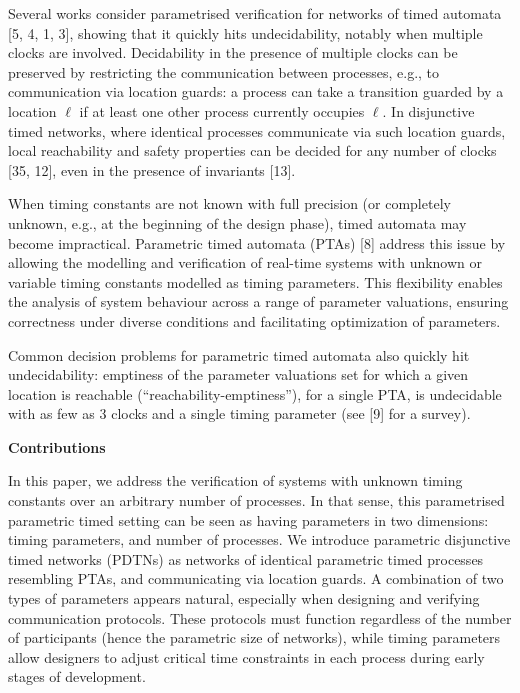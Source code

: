 \documentclass[10pt,a4paper]{article}
\begin{document}
 
 
Several works consider parametrised verification for networks of timed automata [5, 4, 1, 3], showing that it quickly hits undecidability, notably when multiple clocks are involved. Decidability in the presence of multiple clocks can be preserved by restricting the communication between processes, e.g., to communication via location guards: a process can take a transition guarded by a location $\mathrm{\ell}$ if at least one other process currently occupies $\mathrm{\ell}$. In disjunctive timed networks, where identical processes communicate via such location guards, local reachability and safety properties can be decided for any number of clocks [35, 12], even in the presence of invariants [13].\par
 
 
 
When timing constants are not known with full precision (or completely unknown, e.g., at the beginning of the design phase), timed automata may become impractical. Parametric timed automata (PTAs) [8] address this issue by allowing the modelling and verification of real-time systems with unknown or variable timing constants modelled as timing parameters. This flexibility enables the analysis of system behaviour across a range of parameter valuations, ensuring correctness under diverse conditions and facilitating optimization of parameters.\par
 
 
 
Common decision problems for parametric timed automata also quickly hit undecidability: emptiness of the parameter valuations set for which a given location is reachable (“reachability-emptiness”), for a single PTA, is undecidable with as few as 3 clocks and a single timing parameter (see [9] for a survey).\par
 
 
 
\par\medskip\noindent\textbf{Contributions}\par
 
 
In this paper, we address the verification of systems with unknown timing constants over an arbitrary number of processes. In that sense, this parametrised parametric timed setting can be seen as having parameters in two dimensions: timing parameters, and number of processes. We introduce parametric disjunctive timed networks (PDTNs) as networks of identical parametric timed processes resembling PTAs, and communicating via location guards. A combination of two types of parameters appears natural, especially when designing and verifying communication protocols. These protocols must function regardless of the number of participants (hence the parametric size of networks), while timing parameters allow designers to adjust critical time constraints in each process during early stages of development.\par
 
\end{document}
